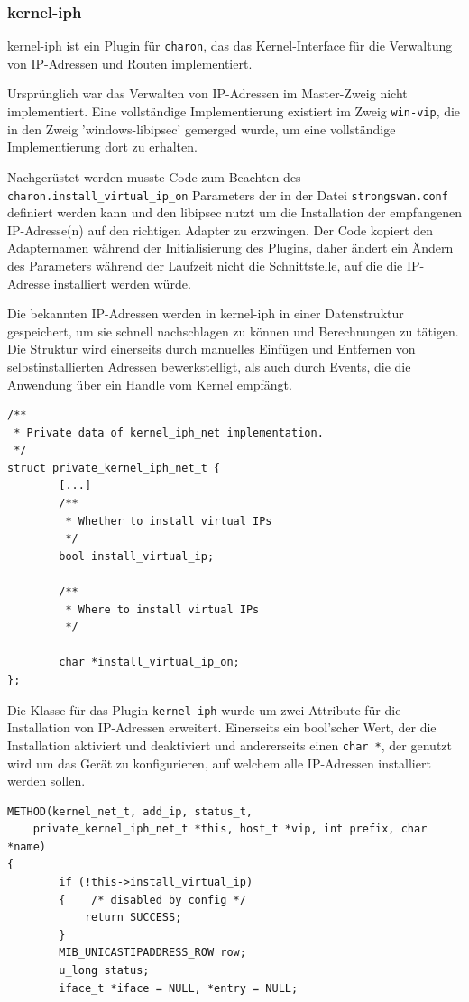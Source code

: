 {\subsubsection{kernel-iph}
kernel-iph ist ein Plugin für \texttt{charon}, das das Kernel-Interface
für die Verwaltung von IP-Adressen und Routen implementiert.

Ursprünglich war das Verwalten von IP-Adressen im Master-Zweig nicht implementiert.
Eine vollständige Implementierung existiert im Zweig \texttt{win-vip}, die in den Zweig 'windows-libipsec'
gemerged wurde, um eine vollständige Implementierung dort zu erhalten.

Nachgerüstet werden musste Code zum Beachten des \texttt{charon.install\_virtual\_ip\_on} Parameters
der in der Datei \texttt{strongswan.conf} definiert werden kann und den libipsec nutzt um
die Installation der empfangenen IP-Adresse(n) auf den richtigen Adapter zu erzwingen.
Der Code kopiert den Adapternamen während der Initialisierung des Plugins, daher
ändert ein Ändern des Parameters während der Laufzeit nicht die Schnittstelle,
auf die die IP-Adresse installiert werden würde.

Die bekannten IP-Adressen werden in kernel-iph in einer Datenstruktur gespeichert,
um sie schnell nachschlagen zu können und Berechnungen zu tätigen. Die Struktur
wird einerseits durch manuelles Einfügen und Entfernen von selbstinstallierten Adressen
bewerkstelligt, als auch durch Events, die die Anwendung über ein Handle
vom Kernel empfängt.

\begin{lstlisting}[caption=Ergänzung zu private\_kernel\_iph\_net\_t,label=lst:kernel_iph]
/**
 * Private data of kernel_iph_net implementation.
 */
struct private_kernel_iph_net_t {
        [...]
        /**
         * Whether to install virtual IPs
         */
        bool install_virtual_ip;

        /**
         * Where to install virtual IPs
         */

        char *install_virtual_ip_on;
};
\end{lstlisting}

Die Klasse für das Plugin \texttt{kernel-iph} wurde um zwei Attribute für die Installation
von \ac{IP}-Adressen erweitert. Einerseits ein bool'scher Wert, der die Installation
aktiviert und deaktiviert und andererseits einen \texttt{char *}, der genutzt wird
um das Gerät zu konfigurieren, auf welchem alle \ac{IP}-Adressen installiert werden sollen.

\begin{lstlisting}[caption=Code für add\_ip,label=lst:kernel_iph_add_ip]
METHOD(kernel_net_t, add_ip, status_t,
    private_kernel_iph_net_t *this, host_t *vip, int prefix, char *name)
{
        if (!this->install_virtual_ip)
        {    /* disabled by config */
            return SUCCESS;
        }
        MIB_UNICASTIPADDRESS_ROW row;
        u_long status;
        iface_t *iface = NULL, *entry = NULL;


\end{lstlisting}}
